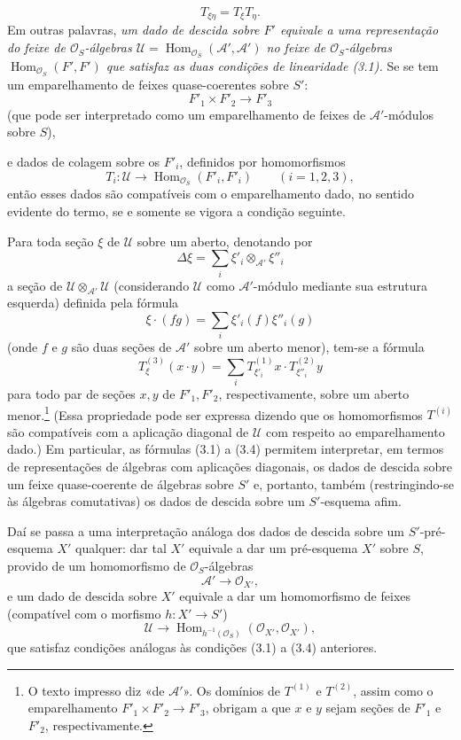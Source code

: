 \documentclass[11pt,twoside,openany]{book}
\numberwithin{equation}{section}
\newcommand{\src}[1]{%
  \phantomsection\hypertarget{src:#1}{}%
  \marginpar{\raggedleft\footnotesize\sffamily #1}%
}
\theoremstyle{plain}
\theoremstyle{definition}
\theoremstyle{remark}
\newcommand{\FgaUnitKey}{frontmatter}
\renewcommand{\src}[1]{%
  \phantomsection\hypertarget{src:\FgaUnitKey:#1}{}%
  \marginpar{\raggedleft\footnotesize\sffamily #1}%
}
\begin{document}
\begin{equation}
  T_{\xi\eta}=T_\xi T_\eta.
  \tag{3.3}
\end{equation}
Em outras palavras, \emph{um dado de descida sobre $F'$ equivale a uma
representação do feixe de $\mathcal O_S$-álgebras
$\mathcal U=\operatorname{Hom}_{\mathcal O_S}(\mathcal A',\mathcal A')$ no
feixe de $\mathcal O_S$-álgebras
$\operatorname{Hom}_{\mathcal O_S}(F',F')$ que satisfaz as duas condições de
linearidade (3.1).} Se se tem um emparelhamento de feixes quase-coerentes sobre
$S'$:
\[
  F'_1\times F'_2\longrightarrow F'_3
\]
(que pode ser interpretado como um emparelhamento de feixes de
$\mathcal A'$-módulos sobre $S$),

\src{320}
e dados de colagem sobre os $F'_i$, definidos por homomorfismos
\[
  T_i:\mathcal U\longrightarrow
  \operatorname{Hom}_{\mathcal O_S}(F'_i,F'_i)
  \qquad (i=1,2,3),
\]
então esses dados são compatíveis com o emparelhamento dado, no sentido
evidente do termo, se e somente se vigora a condição seguinte.

Para toda seção $\xi$ de $\mathcal U$ sobre um aberto, denotando por
\[
  \Delta\xi=\sum_i\xi'_i\otimes_{\mathcal A'}\xi''_i
\]
a seção de $\mathcal U\otimes_{\mathcal A'}\mathcal U$ (considerando
$\mathcal U$ como $\mathcal A'$-módulo mediante sua estrutura esquerda)
definida pela fórmula
\[
  \xi\mathbin{\cdot}(fg)=\sum_i\xi'_i(f)\xi''_i(g)
\]
(onde $f$ e $g$ são duas seções de $\mathcal A'$ sobre um aberto menor),
tem-se a fórmula
\begin{equation}
  T^{(3)}_\xi(x\mathbin{\cdot}y)
  =\sum_iT^{(1)}_{\xi'_i}x\mathbin{\cdot}T^{(2)}_{\xi''_i}y
  \tag{3.4}
\end{equation}
para todo par de seções $x,y$ de $F'_1,F'_2$, respectivamente, sobre um
aberto menor.\footnote{O texto impresso diz «de $\mathcal A'$». Os domínios de
$T^{(1)}$ e $T^{(2)}$, assim como o emparelhamento
$F'_1\times F'_2\longrightarrow F'_3$, obrigam a que $x$ e $y$ sejam seções
de $F'_1$ e $F'_2$, respectivamente.} (Essa propriedade pode ser expressa
dizendo que os homomorfismos $T^{(i)}$ são compatíveis com a aplicação
diagonal de $\mathcal U$ com respeito ao emparelhamento dado.) Em particular, as
fórmulas (3.1) a (3.4) permitem interpretar, em termos de representações de
álgebras com aplicações diagonais, os dados de descida sobre um feixe
quase-coerente de álgebras sobre $S'$ e, portanto, também (restringindo-se às
álgebras comutativas) os dados de descida sobre um $S'$-esquema afim.

Daí se passa a uma interpretação análoga dos dados de descida sobre um
$S'$-pré-esquema $X'$ qualquer: dar tal $X'$ equivale a dar um pré-esquema
$X'$ sobre $S$, provido de um homomorfismo de $\mathcal O_S$-álgebras
\[
  \mathcal A'\longrightarrow\mathcal O_{X'},
\]
e um dado de descida sobre $X'$ equivale a dar um homomorfismo de feixes
(compatível com o morfismo $h:X'\longrightarrow S'$)
\[
  \mathcal U\longrightarrow
  \operatorname{Hom}_{h^{-1}(\mathcal O_S)}
  (\mathcal O_{X'},\mathcal O_{X'}),
\]
que satisfaz condições análogas às condições (3.1) a (3.4) anteriores.
\end{document}
